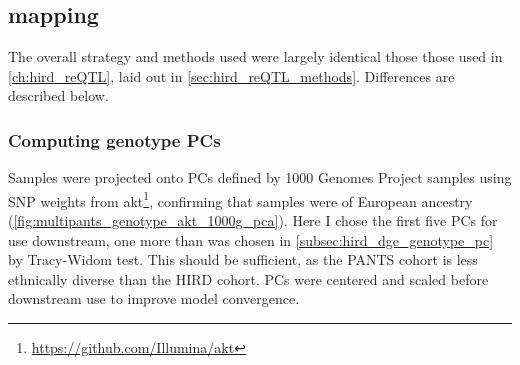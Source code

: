 \subsection{ mapping}

The overall strategy and methods used were largely identical those those used in \cref{ch:hird_reQTL}, laid out in \cref{sec:hird_reQTL_methods}.
Differences are described below.

\subsubsection{Computing genotype PCs}

Samples were projected onto \glspl{PC} defined by 1000 Genomes Project samples using \gls{SNP} weights from {akt}\footnote{\url{https://github.com/Illumina/akt}},
confirming that samples were of European ancestry (\cref{fig:multipants_genotype_akt_1000g_pca}).
Here I chose the first five \glspl{PC} for use downstream, one more than was chosen in \cref{subsec:hird_dge_genotype_pc} by Tracy-Widom test.
This should be sufficient, as the \gls{PANTS} cohort is less ethnically diverse than the \gls{HIRD} cohort.
\glspl{PC} were centered and scaled before downstream use to improve model convergence.

